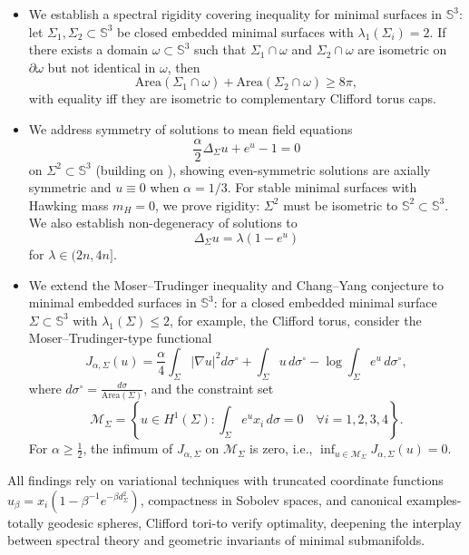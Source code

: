 \documentclass[a4, 12pt]{amsart}
\numberwithin{equation}{section} \numberwithin{equation}{section}
\begin{document}
\begin{itemize}
\item[(vi)] We establish a spectral rigidity covering inequality for minimal surfaces in $\mathbb{S}^3$: let $\Sigma_1, \Sigma_2 \subset \mathbb{S}^3$ be closed embedded minimal surfaces with $\lambda_1(\Sigma_i) = 2$. If there exists a domain $\omega \subset \mathbb{S}^3$ such that $\Sigma_1 \cap \omega$ and $\Sigma_2 \cap \omega$ are isometric on $\partial \omega$ but not identical in $\omega$, then
\[
\text{Area}(\Sigma_1 \cap \omega) + \text{Area}(\Sigma_2 \cap \omega) \geq 8\pi,
\]
with equality iff they are isometric to complementary Clifford torus caps.

\item[(vii)] We address symmetry of solutions to mean field equations
\[
\frac{\alpha}{2}\Delta_\Sigma u + e^u - 1 = 0
\]
on $\Sigma^2 \subset \mathbb{S}^3$ (building on \cite{SSTW}), showing even-symmetric solutions are axially symmetric and $u \equiv 0$ when $\alpha = 1/3$. For stable minimal surfaces with Hawking mass $m_H = 0$, we prove rigidity: $\Sigma^2$ must be isometric to $\mathbb{S}^2 \subset \mathbb{S}^3$. We also establish non-degeneracy of solutions to
\[
\Delta_\Sigma u = \lambda(1 - e^u)
\]
for $\lambda \in (2n, 4n]$.

\item[(viii)] We extend the Moser--Trudinger inequality and Chang--Yang conjecture to minimal embedded surfaces in $\mathbb{S}^3$: for a closed embedded minimal surface $\Sigma \subset \mathbb{S}^3$ with $\lambda_1(\Sigma) \leq 2$, for example, the Clifford torus, consider the Moser--Trudinger-type functional $$J_{\alpha,\Sigma}(u) = \frac{\alpha}{4} \int_\Sigma |\nabla u|^2 d\sigma^\circ + \int_\Sigma u \, d\sigma^\circ - \log \int_\Sigma e^u \, d\sigma^\circ,$$ where $d\sigma^\circ = \frac{d\sigma}{\text{Area}(\Sigma)}$, and the constraint set $$\mathcal{M}_\Sigma = \left\{ u \in H^1(\Sigma) : \int_\Sigma e^u x_i \, d\sigma = 0 \quad \forall i = 1,2,3,4 \right\}.$$ For $\alpha \geq \frac{1}{2}$, the infimum of $J_{\alpha,\Sigma}$ on $\mathcal{M}_\Sigma$ is zero, i.e., $\inf_{u \in \mathcal{M}_\Sigma} J_{\alpha,\Sigma}(u) = 0$.
\end{itemize}

All findings rely on variational techniques with truncated coordinate functions $u_\beta = x_i \left(1 - \beta^{-1}e^{-\beta d_\Sigma^2}\right)$, compactness in Sobolev spaces, and canonical examples-totally geodesic spheres, Clifford tori-to verify optimality, deepening the interplay between spectral theory and geometric invariants of minimal submanifolds.
\end{document}

